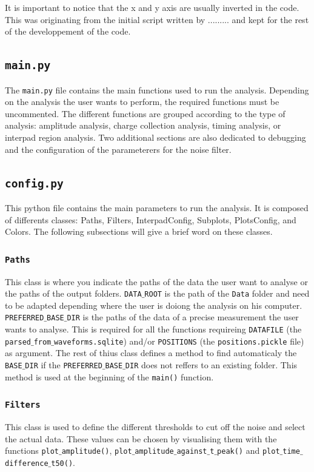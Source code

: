 It is important to notice that the x and y axis are usually inverted in the code. This was originating from the initial script written by ......... and kept for the rest of the developpement of the code. 

\subsection{\texttt{main.py}}

The \texttt{main.py} file contains the main functions used to run the analysis. Depending on the analysis the user wants to perform, the required functions must be uncommented. The different functions are grouped according to the type of analysis: amplitude analysis, charge collection analysis, timing analysis, or interpad region analysis. Two additional sections are also dedicated to debugging and the configuration of the parameterers for the noise filter.

\subsection{\texttt{config.py}}

This python file contains the main parameters to run the analysis. It is composed of differents classes: Paths, Filters, InterpadConfig, Subplots, PlotsConfig, and Colors. The following subsections will give a brief word on these classes. 

\subsubsection{\texttt{Paths}}
This class is where you indicate the paths of the data the user want to analyse or the paths of the output folders. 
\texttt{DATA$\_$ROOT} is the path of the \texttt{Data} folder and need to be adapted depending where the user is doiong the analysis on his computer. 
\texttt{PREFERRED$\_$BASE$\_$DIR} is the paths of the data of a precise measurement the user wants to analyse. This is required for all the functions requireing \texttt{DATAFILE} (the \texttt{parsed$\_$from$\_$waveforms.sqlite}) and/or \texttt{POSITIONS} (the \texttt{positions.pickle} file) as argument.
The rest of thius class defines a method to find automaticaly the \texttt{BASE$\_$DIR} if the \texttt{PREFERRED$\_$BASE$\_$DIR} does not reffers to an existing folder. This method is used at the beginning of the \texttt{main()} function.

\subsubsection{\texttt{Filters}}
This class is used to define the different thresholds to cut off the noise and select the actual data. These values can be chosen by visualising them with the functions \texttt{plot$\_$amplitude()}, \texttt{plot$\_$amplitude$\_$against$\_$t$\_$peak()} and \texttt{plot$\_$time$\_$difference$\_$t50()}. 

